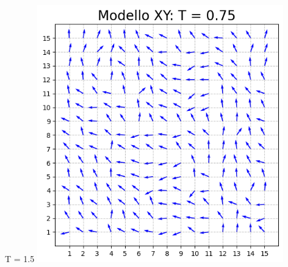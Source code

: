\begin{frame}
\begin{columns}
\begin{column}{0.5\textwidth}
\begin{block}{T = 1.5}
                \centering
                \includegraphics[width=0.8\textwidth]{Immagini/backupXY/conf_T0.75.png}

            \end{block}
        \end{column}
    \end{columns}

\end{frame}



